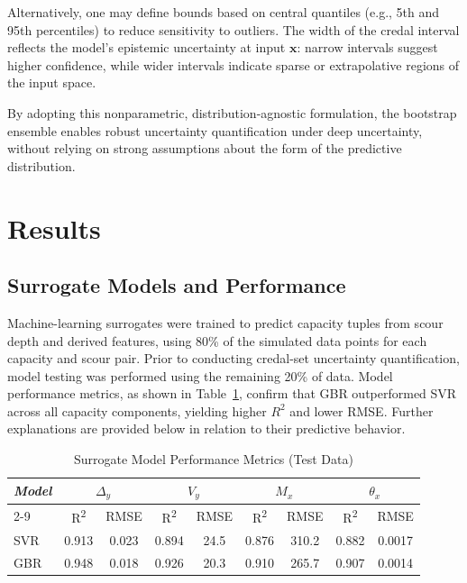 \documentclass[authoryear,preprint,review,12pt]{elsarticle}
\begin{document}
Alternatively, one may define bounds based on central quantiles (e.g., 5th and 95th percentiles) to reduce sensitivity to outliers. The width of the credal interval reflects the model’s epistemic uncertainty at input \( \bm{x} \): narrow intervals suggest higher confidence, while wider intervals indicate sparse or extrapolative regions of the input space.

By adopting this nonparametric, distribution-agnostic formulation, the bootstrap ensemble enables robust uncertainty quantification under deep uncertainty, without relying on strong assumptions about the form of the predictive distribution.


\section{Results}
\subsection{Surrogate Models and Performance}

Machine-learning surrogates were trained to predict capacity tuples from scour depth and derived features, using 80\% of the simulated data points for each capacity and scour pair. Prior to conducting credal-set uncertainty quantification, model testing was performed using the remaining 20\% of data. Model performance metrics, as shown in Table~\ref{tab:model_performance}, confirm that GBR outperformed SVR across all capacity components, yielding higher $R^2$ and lower RMSE. Further explanations are provided below in relation to their predictive behavior.


\begin{table}[htbp]
\caption{Surrogate Model Performance Metrics (Test Data)}
\label{tab:model_performance}
\centering
\begin{tabular}{|l|c|c|c|c|c|c|c|c|}
\hline
\multirow{2}{*}{\textit{Model}} & \multicolumn{2}{c|}{\textit{$\Delta_y$}} & \multicolumn{2}{c|}{\textit{$V_y$}} & \multicolumn{2}{c|}{\textit{$M_x$}} & \multicolumn{2}{c|}{\textit{$\theta_x$}} \\
\cline{2-9}
& R\textsuperscript{2} & RMSE & R\textsuperscript{2} & RMSE & R\textsuperscript{2} & RMSE & R\textsuperscript{2} & RMSE \\
\hline
SVR & 0.913 & 0.023 & 0.894 & 24.5 & 0.876 & 310.2 & 0.882 & 0.0017 \\
GBR & 0.948 & 0.018 & 0.926 & 20.3 & 0.910 & 265.7 & 0.907 & 0.0014 \\
\hline
\end{tabular}
\end{table}
\end{document}
